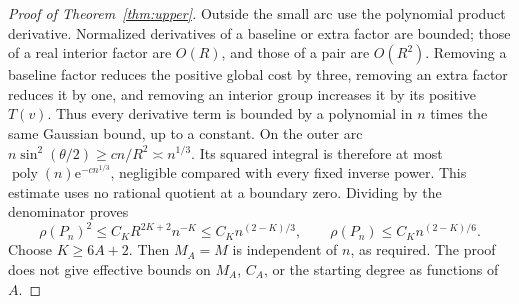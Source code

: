 \documentclass[11pt]{article}
\theoremstyle{remark}\newtheorem{remark}[theorem]{Remark}
\newcommand{\ee}{\mathrm e}
\begin{document}
\begin{proof}[Proof of Theorem~\ref{thm:upper}]
Outside the small arc use the polynomial product derivative.
Normalized derivatives of a baseline or extra factor are bounded;
those of a real interior factor are \(O(R)\), and those of a pair
are \(O(R^2)\). Removing a baseline factor reduces the positive
global cost by three, removing an extra factor reduces it by one,
and removing an interior group increases it by its positive \(T(v)\).
Thus every derivative term is bounded by a polynomial in \(n\)
times the same Gaussian bound, up to a constant. On the outer arc
\(n\sin^2(\theta/2)\ge c n/R^2\asymp n^{1/3}\).
Its squared integral is therefore at most
\(\operatorname{poly}(n)\ee^{-c n^{1/3}}\), negligible compared
with every fixed inverse power. This estimate uses no rational
quotient at a boundary zero. Dividing by the denominator proves
\[
 \rho(P_n)^2\le C_K R^{2K+2}n^{-K}
 \le C_K n^{(2-K)/3},\qquad
 \rho(P_n)\le C_K n^{(2-K)/6}.
\]
Choose \(K\ge6A+2\). Then \(M_A=M\) is independent of \(n\),
as required. The proof does not give effective bounds on \(M_A\),
\(C_A\), or the starting degree as functions of \(A\).
\end{proof}
\end{document}
